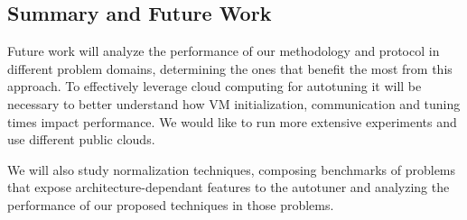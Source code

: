 \subsection{Summary and Future Work}
\label{sec:cloud-conclusion}

Future work will analyze the performance of our methodology and protocol in
different problem domains, determining the ones that benefit the most from this
approach. To effectively leverage cloud computing for autotuning it will be
necessary to better understand how VM initialization, communication and tuning
times impact performance. We would like to run more extensive experiments and
use different public clouds.

We will also study normalization techniques, composing benchmarks of problems
that expose architecture-dependant features to the autotuner and analyzing the
performance of our proposed techniques in those problems.
